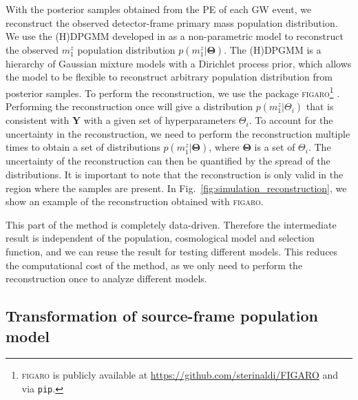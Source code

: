 \documentclass[twocolumn]{aastex631}
\begin{document}
With the posterior samples obtained from the \ac{PE} of each \ac{GW} event, we reconstruct the observed detector-frame primary mass population distribution.
We use the \ac{(H)DPGMM} developed in \citet{Rinaldi:2021bhm} as a non-parametric model to reconstruct the observed $m^z_1$ population distribution $p(m^z_1|\mathbf{\Theta})$.
The \ac{(H)DPGMM} is a hierarchy of Gaussian mixture models with a Dirichlet process prior, which allows the model to be flexible to reconstruct arbitrary population distribution from posterior samples.
To perform the reconstruction, we use the package \textsc{figaro}\footnote{\textsc{figaro} is publicly available at \url{https://github.com/sterinaldi/FIGARO} and via \texttt{pip}.} \citep{Rinaldi:2024eep}.
Performing the reconstruction once will give a distribution $p(m^z_1|\Theta_i)$ that is consistent with $\mathbf{Y}$ with a given set of hyperparameters $\Theta_i$.
To account for the uncertainty in the reconstruction, we need to perform the reconstruction multiple times to obtain a set of distributions $p(m^z_1|\mathbf{\Theta})$, where $\mathbf{\Theta}$ is a set of $\Theta_i$.
The uncertainty of the reconstruction can then be quantified by the spread of the distributions.
It is important to note that the reconstruction is only valid in the region where the samples are present.
In Fig.~\ref{fig:simulation_reconstruction}, we show an example of the reconstruction obtained with \textsc{figaro}.

This part of the method is completely data-driven.
Therefore the intermediate result is independent of the population, cosmological model and selection function, and we can reuse the result for testing different models.
This reduces the computational cost of the method, as we only need to perform the reconstruction once to analyze different models.

\subsection{Transformation of source-frame population model}
\label{sec:transformation}
\end{document}
